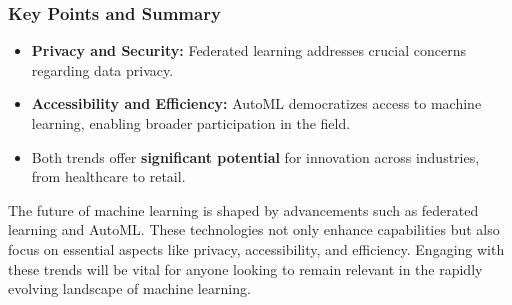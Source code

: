 \documentclass[aspectratio=169]{beamer}
\begin{document}
\begin{frame}[fragile]
    \frametitle{Key Points and Summary}
    \begin{itemize}
        \item \textbf{Privacy and Security:} Federated learning addresses crucial concerns regarding data privacy.
        \item \textbf{Accessibility and Efficiency:} AutoML democratizes access to machine learning, enabling broader participation in the field.
        \item Both trends offer \textbf{significant potential} for innovation across industries, from healthcare to retail.
    \end{itemize}

    The future of machine learning is shaped by advancements such as federated learning and AutoML. 
    These technologies not only enhance capabilities but also focus on essential aspects like privacy, accessibility, and efficiency. 
    Engaging with these trends will be vital for anyone looking to remain relevant in the rapidly evolving landscape of machine learning.
\end{frame}
\end{document}
